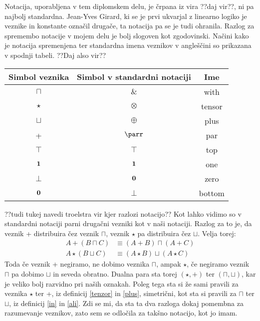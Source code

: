 Notacija, uporabljena v tem diplomskem delu, je črpana iz vira ??daj vir??, ni pa najbolj standardna. Jean-Yves Girard, ki se je prvi ukvarjal z linearno logiko je veznike in konstante označil drugače, ta notacija pa se je tudi ohranila. Razlog za spremembo notacije v mojem delu je bolj slogoven kot zgodovinski. Načini kako je notacija spremenjena ter standardna imena veznikov v angleščini so prikazana v spodnji tabeli. ??Daj also vir??
\begin{center}
\begin{tabular}{||c|c|c||}
    \hline
    Simbol veznika & Simbol v standardni notaciji & Ime \\
    \hline\hline
    $\sqcap$ & $\&$ & with \\
    \hline
    $\star$ & $\otimes$ & tensor \\
    \hline
    $\sqcup$ & $\oplus$ & plus \\
    \hline
    + & $\parr$ & par \\
    \hline
    $\top$ & $\top$ & top \\
    \hline
    $\mathbf{1}$ & $\mathbf{1}$ & one \\
    \hline
    $\bot$ & $\mathbf{0}$ & zero \\
    \hline
    $\mathbf{0}$ & $\bot$ & bottom \\
    \hline
    \end{tabular}
\end{center}

??tudi tukej navedi troelstra vir kjer razlozi notacijo??
Kot lahko vidimo so v standardni notaciji parni drugačni vezniki kot v naši notaciji. Razlog za to je, da veznik + distribuira čez veznik $\sqcap$, veznik $\star$ pa distribuira čez $\sqcup$. Velja torej:
\begin{align*}
    A + (B \sqcap C) &\equiv (A + B) \sqcap (A + C)\\
    A \star (B \sqcup C) &\equiv (A \star B) \sqcup (A \star C)
\end{align*}
Toda če veznik + negiramo, ne dobimo veznika $\sqcap$, ampak $\star$, če negiramo veznik $\sqcap$ pa dobimo $\sqcup$ in seveda obratno. Dualna para sta torej $(\star,+)$ ter $(\sqcap,\sqcup)$, kar je veliko bolj razvidno pri naših oznakah. Poleg tega sta si že sami pravili za veznika $\star$ ter +, iz definicij \ref{tenzor} in \ref{plus}, simetrični, kot sta si pravili za $\sqcap$ ter $\sqcup$, iz definicij \ref{in} in \ref{ali}. Zdi se mi, da sta ta dva razloga dokaj pomembna za razumevanje veznikov, zato sem se odločila za takšno notacijo, kot jo imam.


